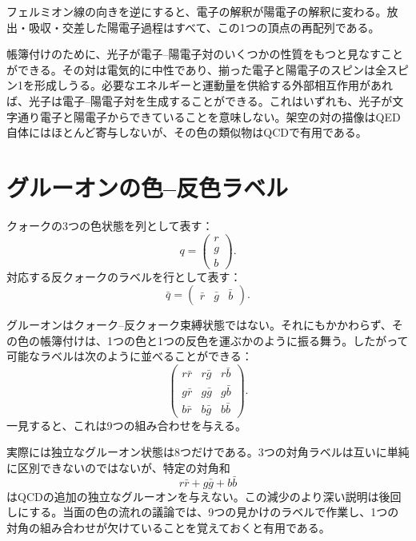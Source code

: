 フェルミオン線の向きを逆にすると、電子の解釈が陽電子の解釈に変わる。放出・吸収・交差した陽電子過程はすべて、この1つの頂点の再配列である。

帳簿付けのために、光子が電子--陽電子対のいくつかの性質をもつと見なすことができる。その対は電気的に中性であり、揃った電子と陽電子のスピンは全スピン1を形成しうる。必要なエネルギーと運動量を供給する外部相互作用があれば、光子は電子--陽電子対を生成することができる。これはいずれも、光子が文字通り電子と陽電子からできていることを意味しない。架空の対の描像はQED自体にはほとんど寄与しないが、その色の類似物はQCDで有用である。

\section{グルーオンの色--反色ラベル}

クォークの3つの色状態を列として表す：
\begin{equation}
q=
\begin{pmatrix}
r\\
g\\
b
\end{pmatrix}.
\end{equation}
対応する反クォークのラベルを行として表す：
\begin{equation}
\bar q=
\begin{pmatrix}
\bar r&\bar g&\bar b
\end{pmatrix}.
\end{equation}

グルーオンはクォーク--反クォーク束縛状態ではない。それにもかかわらず、その色の帳簿付けは、1つの色と1つの反色を運ぶかのように振る舞う。したがって可能なラベルは次のように並べることができる：
\begin{equation}
\begin{pmatrix}
r\bar r&r\bar g&r\bar b\\
g\bar r&g\bar g&g\bar b\\
b\bar r&b\bar g&b\bar b
\end{pmatrix}.
\end{equation}
一見すると、これは9つの組み合わせを与える。

\begin{classroomqa}
\end{classroomqa}

実際には独立なグルーオン状態は8つだけである。3つの対角ラベルは互いに単純に区別できないのではないが、特定の対角和
\begin{equation}
r\bar r+g\bar g+b\bar b
\end{equation}
はQCDの追加の独立なグルーオンを与えない。この減少のより深い説明は後回しにする。当面の色の流れの議論では、9つの見かけのラベルで作業し、1つの対角の組み合わせが欠けていることを覚えておくと有用である。

